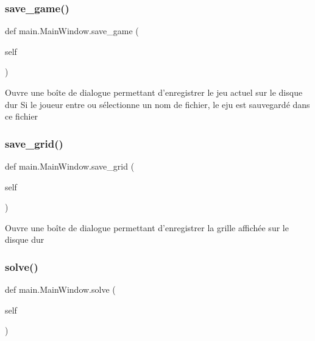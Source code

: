 \subsubsection{\texorpdfstring{save\+\_\+game()}{save\_game()}}
{\footnotesize\ttfamily def main.\+Main\+Window.\+save\+\_\+game (\begin{DoxyParamCaption}\item[{}]{self }\end{DoxyParamCaption})}

\begin{DoxyVerb}Ouvre une boîte de dialogue permettant d'enregistrer le jeu actuel sur le disque dur
    Si le joueur entre ou sélectionne un nom de fichier, le eju est sauvegardé dans ce fichier\end{DoxyVerb}
 \mbox{\label{classmain_1_1MainWindow_a558ce5d5b1925ec43d49e7acdf5af822}} 
\subsubsection{\texorpdfstring{save\+\_\+grid()}{save\_grid()}}
{\footnotesize\ttfamily def main.\+Main\+Window.\+save\+\_\+grid (\begin{DoxyParamCaption}\item[{}]{self }\end{DoxyParamCaption})}

\begin{DoxyVerb}Ouvre une boîte de dialogue permettant d'enregistrer la grille affichée sur le disque dur\end{DoxyVerb}
 \mbox{\label{classmain_1_1MainWindow_a5d1cca4f479efac16adbe9c980368bb3}} 
\subsubsection{\texorpdfstring{solve()}{solve()}}
{\footnotesize\ttfamily def main.\+Main\+Window.\+solve (\begin{DoxyParamCaption}\item[{}]{self }\end{DoxyParamCaption})}


